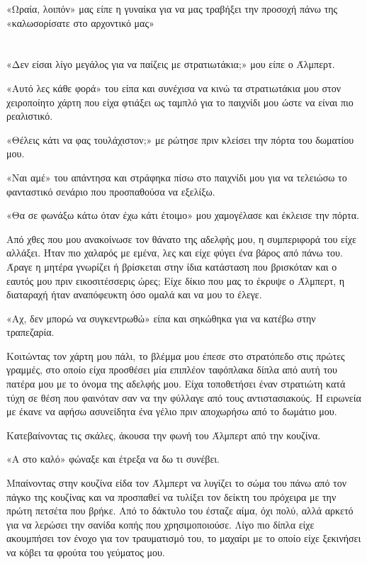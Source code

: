 \documentclass[12pt,twoside, openany]{book}
\begin{document}
«Ωραία, λοιπόν» μας είπε η γυναίκα για να μας τραβήξει την προσοχή πάνω της «καλωσορίσατε στο αρχοντικό μας»


\chapter{}


«Δεν είσαι λίγο μεγάλος για να παίζεις με στρατιωτάκια;» μου είπε ο Άλμπερτ.

«Αυτό λες κάθε φορά» του είπα και συνέχισα να κινώ τα στρατιωτάκια μου στον χειροποίητο χάρτη που είχα φτιάξει ως ταμπλό για το παιχνίδι μου ώστε να είναι πιο ρεαλιστικό.

«Θέλεις κάτι να φας τουλάχιστον;» με ρώτησε πριν κλείσει την πόρτα του δωματίου μου.

«Ναι αμέ» του απάντησα και στράφηκα πίσω στο παιχνίδι μου για να τελειώσω το φανταστικό σενάριο που προσπαθούσα να εξελίξω.

«Θα σε φωνάξω κάτω όταν έχω κάτι έτοιμο» μου χαμογέλασε και έκλεισε την πόρτα.

Από χθες που μου ανακοίνωσε τον θάνατο της αδελφής μου, η συμπεριφορά του είχε αλλάξει. Ήταν πιο χαλαρός με εμένα, λες και είχε φύγει ένα βάρος από πάνω του. Άραγε η μητέρα γνωρίζει ή βρίσκεται στην ίδια κατάσταση που βρισκόταν και ο εαυτός μου πριν εικοσιτέσσερις ώρες; Είχε δίκιο που μας το έκρυψε ο Άλμπερτ, η διαταραχή ήταν αναπόφευκτη όσο ομαλά και να μου το έλεγε. 

«Αχ, δεν μπορώ να συγκεντρωθώ» είπα και σηκώθηκα για να κατέβω στην τραπεζαρία.

Κοιτώντας τον χάρτη μου πάλι, το βλέμμα μου έπεσε στο στρατόπεδο στις πρώτες γραμμές, στο οποίο είχα προσθέσει μία επιπλέον ταφόπλακα δίπλα από αυτή του πατέρα μου με το όνομα της αδελφής μου. Είχα τοποθετήσει έναν στρατιώτη κατά τύχη σε θέση που φαινόταν σαν να την φύλλαγε από τους αντιστασιακούς. Η ειρωνεία με έκανε να αφήσω ασυνείδητα ένα γέλιο πριν αποχωρήσω από το δωμάτιο μου.

Κατεβαίνοντας τις σκάλες, άκουσα την φωνή του Άλμπερτ από την κουζίνα.

«Α στο καλό» φώναξε και έτρεξα να δω τι συνέβει.

Μπαίνοντας στην κουζίνα είδα τον Άλμπερτ να λυγίζει το σώμα του πάνω από τον πάγκο της κουζίνας και να προσπαθεί να τυλίξει τον δείκτη του πρόχειρα με την πρώτη πετσέτα που βρήκε. Από το δάκτυλο του έσταζε αίμα, όχι πολύ, αλλά αρκετό για να λερώσει την σανίδα κοπής που χρησιμοποιούσε. Λίγο πιο δίπλα είχε ακουμπήσει τον ένοχο για τον τραυματισμό του, το μαχαίρι με το οποίο είχε ξεκινήσει να κόβει τα φρούτα του γεύματος μου.
\end{document}
